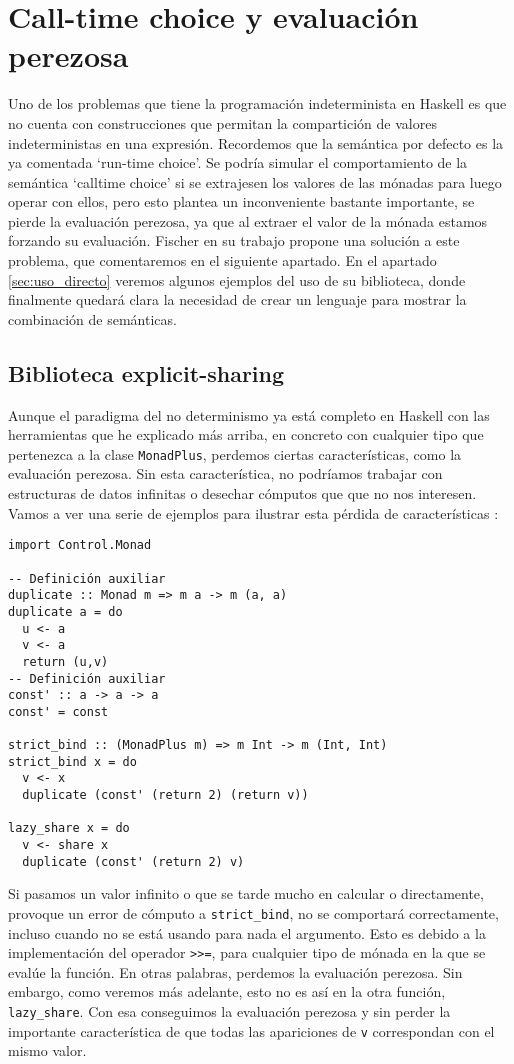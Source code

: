 \documentclass[class=article, crop=false]{standalone}
\begin{document}
\section{Call-time choice y evaluación perezosa}
Uno de los problemas que tiene la programación indeterminista en Haskell es que no cuenta con
construcciones que permitan la compartición de valores indeterministas en una expresión.
Recordemos que la semántica por defecto es la ya comentada `run-time choice'. Se podría
simular el comportamiento de la semántica `calltime choice' si se extrajesen los valores de
las mónadas para luego operar con ellos, pero esto plantea un inconveniente bastante
importante, se pierde la evaluación perezosa, ya que al extraer el valor de la mónada estamos
forzando su evaluación. Fischer en su trabajo propone una solución a este problema, que
comentaremos en el siguiente apartado. En el apartado \ref{sec:uso_directo} veremos algunos
ejemplos del uso de su biblioteca, donde finalmente quedará clara la necesidad de crear un
lenguaje para mostrar la combinación de semánticas.

\subsection{Biblioteca explicit-sharing}\label{sec:explicit_sharing}
Aunque el paradigma del no determinismo ya está completo en Haskell con las herramientas que
he explicado más arriba, en concreto con cualquier tipo que pertenezca a la clase
\verb`MonadPlus`, perdemos ciertas características, como la evaluación perezosa. Sin esta
característica, no podríamos trabajar con estructuras de datos infinitas o desechar cómputos
que que no nos interesen. Vamos a ver una serie de ejemplos para ilustrar esta pérdida de
características \cite{fischer2011purely}:

\begin{verbatim}
import Control.Monad

-- Definición auxiliar
duplicate :: Monad m => m a -> m (a, a)
duplicate a = do
  u <- a
  v <- a
  return (u,v)
-- Definición auxiliar
const' :: a -> a -> a
const' = const

strict_bind :: (MonadPlus m) => m Int -> m (Int, Int)
strict_bind x = do
  v <- x
  duplicate (const' (return 2) (return v))

lazy_share x = do
  v <- share x
  duplicate (const' (return 2) v)
\end{verbatim}

Si pasamos un valor infinito o que se tarde mucho en calcular o directamente, provoque un
error de cómputo a \verb`strict_bind`, no se comportará correctamente, incluso cuando no se
está usando para nada el argumento. Esto es debido a la implementación del operador
\verb`>>=`, para cualquier tipo de mónada en la que se evalúe la función. En otras palabras,
perdemos la evaluación perezosa. Sin embargo, como veremos más adelante, esto no es así en
la otra función, \verb`lazy_share`. Con esa conseguimos la evaluación perezosa y sin perder
la importante característica de que todas las apariciones de \verb`v` correspondan con el
mismo valor.
\newpage
\end{document}
